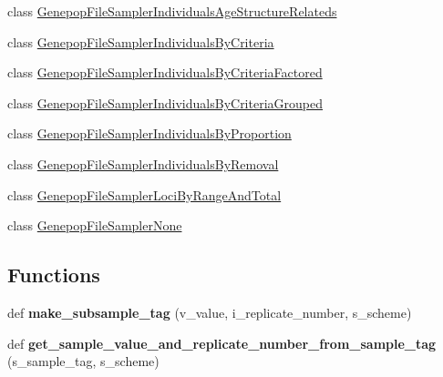 \begin{DoxyCompactItemize}
\item 
class \hyperlink{classnegui_1_1genepopfilesampler_1_1GenepopFileSamplerIndividualsAgeStructureRelateds}{Genepop\+File\+Sampler\+Individuals\+Age\+Structure\+Relateds}
\item 
class \hyperlink{classnegui_1_1genepopfilesampler_1_1GenepopFileSamplerIndividualsByCriteria}{Genepop\+File\+Sampler\+Individuals\+By\+Criteria}
\item 
class \hyperlink{classnegui_1_1genepopfilesampler_1_1GenepopFileSamplerIndividualsByCriteriaFactored}{Genepop\+File\+Sampler\+Individuals\+By\+Criteria\+Factored}
\item 
class \hyperlink{classnegui_1_1genepopfilesampler_1_1GenepopFileSamplerIndividualsByCriteriaGrouped}{Genepop\+File\+Sampler\+Individuals\+By\+Criteria\+Grouped}
\item 
class \hyperlink{classnegui_1_1genepopfilesampler_1_1GenepopFileSamplerIndividualsByProportion}{Genepop\+File\+Sampler\+Individuals\+By\+Proportion}
\item 
class \hyperlink{classnegui_1_1genepopfilesampler_1_1GenepopFileSamplerIndividualsByRemoval}{Genepop\+File\+Sampler\+Individuals\+By\+Removal}
\item 
class \hyperlink{classnegui_1_1genepopfilesampler_1_1GenepopFileSamplerLociByRangeAndTotal}{Genepop\+File\+Sampler\+Loci\+By\+Range\+And\+Total}
\item 
class \hyperlink{classnegui_1_1genepopfilesampler_1_1GenepopFileSamplerNone}{Genepop\+File\+Sampler\+None}
\end{DoxyCompactItemize}
\subsection*{Functions}
\begin{DoxyCompactItemize}
\item 
def {\bfseries make\+\_\+subsample\+\_\+tag} (v\+\_\+value, i\+\_\+replicate\+\_\+number, s\+\_\+scheme)\hypertarget{namespacenegui_1_1genepopfilesampler_a1bc84ad362bf9aa4a57f568fd740171e}{}\label{namespacenegui_1_1genepopfilesampler_a1bc84ad362bf9aa4a57f568fd740171e}

\item 
def {\bfseries get\+\_\+sample\+\_\+value\+\_\+and\+\_\+replicate\+\_\+number\+\_\+from\+\_\+sample\+\_\+tag} (s\+\_\+sample\+\_\+tag, s\+\_\+scheme)\hypertarget{namespacenegui_1_1genepopfilesampler_add6542ca0344658bb772d671ef34d761}{}\label{namespacenegui_1_1genepopfilesampler_add6542ca0344658bb772d671ef34d761}

\end{DoxyCompactItemize}
